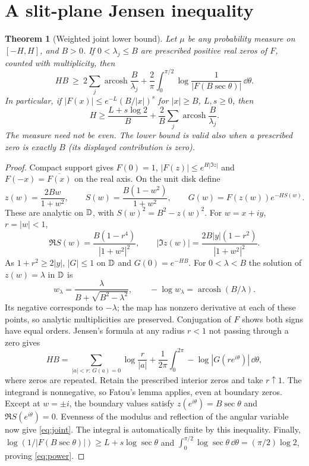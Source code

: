 \documentclass[11pt]{article}
\newtheorem{theorem}{Theorem}
\theoremstyle{remark}\newtheorem{remark}[theorem]{Remark}
\newcommand{\arcosh}{\operatorname{arcosh}}\newcommand{\ord}{\operatorname{ord}}
\begin{document}
\section{A slit-plane Jensen inequality}
\begin{theorem}[Weighted joint lower bound]\label{thm:slit}
Let $\mu$ be any probability measure on $[-H,H]$, and $B>0$. If $0<\lambda_j\le B$ are prescribed positive real zeros of $F$, counted with multiplicity, then
\begin{equation}\label{eq:joint}
 HB\ \ge\ 2\sum_j\arcosh\frac B{\lambda_j}
  +\frac2\pi\int_0^{\pi/2}\log\frac1{|F(B\sec\theta)|}\,\dd\theta.
\end{equation}
In particular, if $|F(x)|\le e^{-L}(B/|x|)^s$ for $|x|\ge B$, $L,s\ge0$, then
\begin{equation}\label{eq:power}
 H\ge \frac{L+s\log2}{B}+\frac2B\sum_j\arcosh\frac B{\lambda_j}.
\end{equation}
The measure need not be even. The lower bound is valid also when a prescribed zero is exactly $B$ (its displayed contribution is zero).
\end{theorem}
\begin{proof}
Compact support gives $F(0)=1$, $|F(z)|\le e^{H|\Im z|}$ and $F(-x)=\overline{F(x)}$ on the real axis. On the unit disk define
\[
 z(w)=\frac{2Bw}{1+w^2},\qquad S(w)=\frac{B(1-w^2)}{1+w^2},\qquad
 G(w)=F(z(w))e^{-HS(w)}.
\]
These are analytic on $\mathbb D$, with $S(w)^2=B^2-z(w)^2$. For $w=x+iy$, $r=|w|<1$,
\[
 \Re S(w)=\frac{B(1-r^4)}{|1+w^2|^2},\qquad
 |\Im z(w)|=\frac{2B|y|(1-r^2)}{|1+w^2|^2}.
\]
As $1+r^2\ge2|y|$, $|G|\le1$ on $\mathbb D$ and $G(0)=e^{-HB}$. For $0<\lambda<B$ the solution of $z(w)=\lambda$ in $\mathbb D$ is
\[
 w_\lambda=\frac{\lambda}{B+\sqrt{B^2-\lambda^2}},\qquad
 -\log w_\lambda=\arcosh(B/\lambda).
\]
Its negative corresponds to $-\lambda$; the map has nonzero derivative at each of these points, so analytic multiplicities are preserved. Conjugation of $F$ shows both signs have equal orders. Jensen's formula at any radius $r<1$ not passing through a zero gives
\[
 HB=\sum_{|a|<r:\,G(a)=0}\log\frac r{|a|}
       +\frac1{2\pi}\int_0^{2\pi}-\log|G(re^{i\theta})|\,\dd\theta,
\]
where zeros are repeated. Retain the prescribed interior zeros and take $r\uparrow1$. The integrand is nonnegative, so Fatou's lemma applies, even at boundary zeros. Except at $w=\pm i$, the boundary values satisfy $z(e^{i\theta})=B\sec\theta$ and $\Re S(e^{i\theta})=0$. Evenness of the modulus and reflection of the angular variable now give \eqref{eq:joint}. The integral is automatically finite by this inequality. Finally, $\log(1/|F(B\sec\theta)|)\ge L+s\log\sec\theta$ and $\int_0^{\pi/2}\log\sec\theta\,\dd\theta=(\pi/2)\log2$, proving \eqref{eq:power}.
\end{proof}
\end{document}
